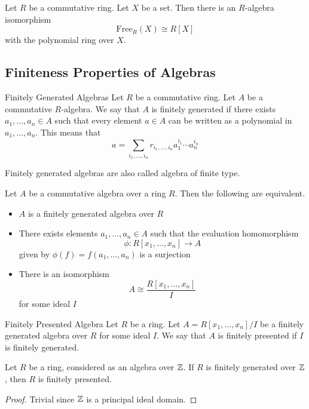 \documentclass[a4paper]{article}
\begin{document}
\begin{prp}{}{} Let $R$ be a commutative ring. Let $X$ be a set. Then there is an $R$-algebra isomorphism $$\text{Free}_R(X)\cong R[X]$$ with the polynomial ring over $X$. 
\end{prp}

\subsection{Finiteness Properties of Algebras}
\begin{defn}{Finitely Generated Algebras}{} Let $R$ be a commutative ring. Let $A$ be a commutative $R$-algebra. We say that $A$ is finitely generated if there exists $a_1,\dots,a_n\in A$ such that every element $a\in A$ can be written as a polynomial in $a_1,\dots,a_n$. This means that $$a=\sum_{i_1,\dots,i_n}r_{i_1,\dots,i_n}a_1^{i_1}\cdots a_n^{i_n}$$
\end{defn}

Finitely generated algebras are also called algebra of finite type. 

\begin{thm}{}{} Let $A$ be a commutative algebra over a ring $R$. Then the following are equivalent. 
\begin{itemize}
\item $A$ is a finitely generated algebra over $R$
\item There exists elements $a_1,\dots,a_n\in A$ such that the evaluation homomorphism $$\phi:R[x_1,\dots,x_n]\to A$$ given by $\phi(f)=f(a_1,\dots,a_n)$ is a surjection
\item There is an isomorphism $$A\cong\frac{R[x_1,\dots,x_n]}{I}$$ for some ideal $I$
\end{itemize}
\end{thm}

\begin{defn}{Finitely Presented Algebra}{} Let $R$ be a ring. Let $A=R[x_1,\dots,x_n]/I$ be a finitely generated algebra over $R$ for some ideal $I$. We say that $A$ is finitely presented if $I$ is finitely generated. 
\end{defn}

\begin{lmm}{}{} Let $R$ be a ring, considered as an algebra over $\mathbb{Z}$. If $R$ is finitely generated over $\mathbb{Z}$, then $R$ is finitely presented. \tcbline
\begin{proof}
Trivial since $\mathbb{Z}$ is a principal ideal domain. 
\end{proof}
\end{lmm}
\end{document}
